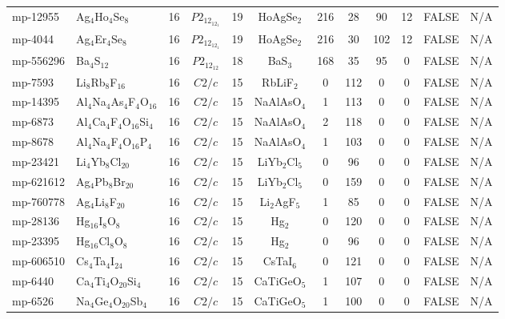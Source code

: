 {\begin{longtable}{llcccccccccc}
    mp-12955 & Ag$_{4}$Ho$_{4}$Se$_{8}$ & 16    & $P2_12_12_1$ & 19    & HoAgSe$_{2}$ & 216   & 28    & 90    & 12    & FALSE & N/A \\
    mp-4044 & Ag$_{4}$Er$_{4}$Se$_{8}$ & 16    & $P2_12_12_1$ & 19    & HoAgSe$_{2}$ & 216   & 30    & 102   & 12    & FALSE & N/A \\
    mp-556296 & Ba$_{4}$S$_{12}$ & 16    & $P2_12_12$ & 18    & BaS$_{3}$ & 168   & 35    & 95    & 0     & FALSE & N/A \\
    mp-7593 & Li$_{8}$Rb$_{8}$F$_{16}$ & 16    & $C2/c$ & 15    & RbLiF$_{2}$ & 0     & 112   & 0     & 0     & FALSE & N/A \\
    mp-14395 & Al$_{4}$Na$_{4}$As$_{4}$F$_{4}$O$_{16}$ & 16    & $C2/c$ & 15    & NaAlAsO$_{4}$ & 1     & 113   & 0     & 0     & FALSE & N/A \\
    mp-6873 & Al$_{4}$Ca$_{4}$F$_{4}$O$_{16}$Si$_{4}$ & 16    & $C2/c$ & 15    & NaAlAsO$_{4}$ & 2     & 118   & 0     & 0     & FALSE & N/A \\
    mp-8678 & Al$_{4}$Na$_{4}$F$_{4}$O$_{16}$P$_{4}$ & 16    & $C2/c$ & 15    & NaAlAsO$_{4}$ & 1     & 103   & 0     & 0     & FALSE & N/A \\
    mp-23421 & Li$_{4}$Yb$_{8}$Cl$_{20}$ & 16    & $C2/c$ & 15    & LiYb$_{2}$Cl$_{5}$ & 0     & 96    & 0     & 0     & FALSE & N/A \\
    mp-621612 & Ag$_{4}$Pb$_{8}$Br$_{20}$ & 16    & $C2/c$ & 15    & LiYb$_{2}$Cl$_{5}$ & 0     & 159   & 0     & 0     & FALSE & N/A \\
    mp-760778 & Ag$_{4}$Li$_{8}$F$_{20}$ & 16    & $C2/c$ & 15    & Li$_{2}$AgF$_{5}$ & 1     & 85    & 0     & 0     & FALSE & N/A \\
    mp-28136 & Hg$_{16}$I$_{8}$O$_{8}$ & 16    & $C2/c$ & 15    & Hg$_{2}$ & 0     & 120   & 0     & 0     & FALSE & N/A \\
    mp-23395 & Hg$_{16}$Cl$_{8}$O$_{8}$ & 16    & $C2/c$ & 15    & Hg$_{2}$ & 0     & 96    & 0     & 0     & FALSE & N/A \\
    mp-606510 & Cs$_{4}$Ta$_{4}$I$_{24}$ & 16    & $C2/c$ & 15    & CsTaI$_{6}$ & 0     & 121   & 0     & 0     & FALSE & N/A \\
    mp-6440 & Ca$_{4}$Ti$_{4}$O$_{20}$Si$_{4}$ & 16    & $C2/c$ & 15    & CaTiGeO$_{5}$ & 1     & 107   & 0     & 0     & FALSE & N/A \\
    mp-6526 & Na$_{4}$Ge$_{4}$O$_{20}$Sb$_{4}$ & 16    & $C2/c$ & 15    & CaTiGeO$_{5}$ & 1     & 100   & 0     & 0     & FALSE & N/A \\

\end{longtable}}
